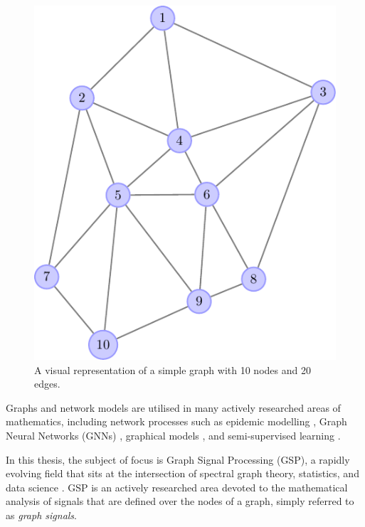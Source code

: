 \begin{figure}
	\centering
		\includegraphics[width=\linewidth]{Figures/graph_plot.pdf}
	\caption[A visual representation of a simple graph]{A visual representation of a simple graph with 10 nodes and 20 edges.}
	\label{fig:basic_graph}
\end{figure}


Graphs and network models are utilised in many actively researched areas of mathematics, including network processes such as epidemic modelling \citep{Pare2020}, Graph Neural Networks (GNNs) \citep{Zhou2020}, graphical models \citep{Holmes2008}, and semi-supervised learning \citep{Chong2020}.

\vspace{0.1cm}

In this thesis, the subject of focus is Graph Signal Processing (GSP), a rapidly evolving field that sits at the intersection of spectral graph theory, statistics, and data science \citep{Ortega2018}. GSP is an actively researched area devoted to the mathematical analysis of signals that are defined over the nodes of a graph, simply referred to as \textit{graph signals}. \phantom{In this thesis we are  }

